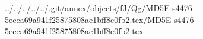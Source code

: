../../../../../.git/annex/objects/fJ/Qg/MD5E-s4476--5ecea69a941f25875808ae1bff8e0fb2.tex/MD5E-s4476--5ecea69a941f25875808ae1bff8e0fb2.tex